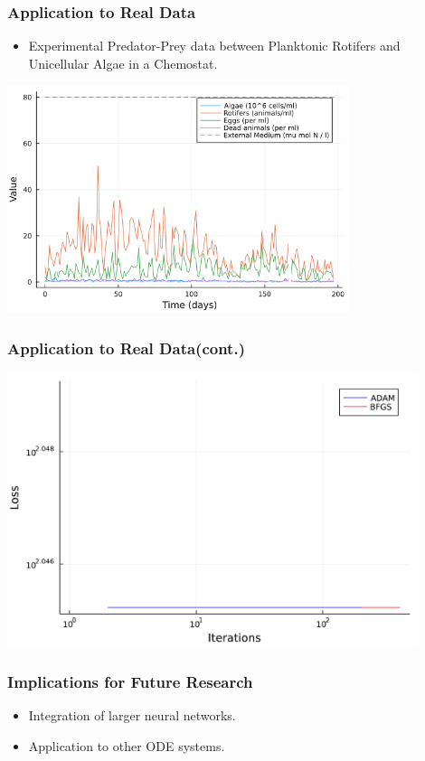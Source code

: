 \documentclass[aspectratio=169]{beamer}
\begin{document}
\begin{frame}
  \frametitle{Application to Real Data}
  \begin{itemize}
    \item Experimental Predator-Prey data between Planktonic Rotifers and Unicellular Algae in a Chemostat.
  \end{itemize}
  \includegraphics[width=10cm, height = 6.66cm]{plots/output_plot.png}
\end{frame}

\begin{frame}
  \frametitle{Application to Real Data(cont.)}
  \begin{itemize}
  \end{itemize}
  \includegraphics[width=12cm]{plots/Chemostat_losses.pdf}
\end{frame}

\begin{frame}
  \frametitle{Implications for Future Research}
  \begin{itemize}
    \item Integration of larger neural networks.
    \item Application to other ODE systems.
  \end{itemize}
\end{frame}
\end{document}
